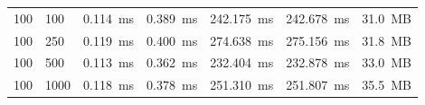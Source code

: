 \begin{table}[!t]
\begin{tabular}{llcccccccc}
100 & 100 & \multicolumn{2}{c}{0.114~ms} & \multicolumn{2}{c}{0.389~ms} & \multicolumn{2}{c}{242.175~ms} & 242.678~ms & 31.0~MB \\
100 & 250 & \multicolumn{2}{c}{0.119~ms} & \multicolumn{2}{c}{0.400~ms} & \multicolumn{2}{c}{274.638~ms} & 275.156~ms & 31.8~MB \\
100 & 500 & \multicolumn{2}{c}{0.113~ms} & \multicolumn{2}{c}{0.362~ms} & \multicolumn{2}{c}{232.404~ms} & 232.878~ms & 33.0~MB \\
100 & 1000 & \multicolumn{2}{c}{0.118~ms} & \multicolumn{2}{c}{0.378~ms} & \multicolumn{2}{c}{251.310~ms} & 251.807~ms & 35.5~MB \\
\bottomrule
\end{tabular}
\end{table}